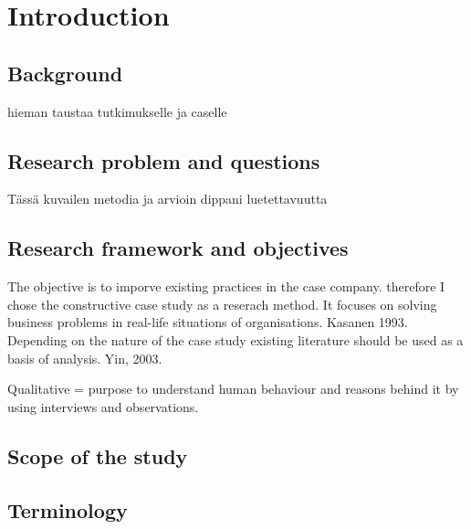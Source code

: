 \documentclass[12pt,a4paper,oneside,pdftex]{report}
\begin{document}
\pagestyle{headings}


% 

\chapter{Introduction}
\label{chapter:intro}






\section{Background}

hieman taustaa tutkimukselle ja caselle

\section{Research problem and questions}
\label{section:constructive}

Tässä kuvailen metodia ja arvioin dippani luetettavuutta

\section{Research framework and objectives}
\label{section:structure}

The objective is to imporve existing practices in the case company. therefore I chose the constructive case study as a reserach method. It focuses on solving business problems in real-life situations of organisations. Kasanen 1993. Depending on the nature of the case study existing literature should be used as a basis of analysis. Yin, 2003. 

Qualitative = purpose to understand human behaviour and reasons behind it by using interviews and observations. 

\section{Scope of the study}
\label{section:structure}

\section{Terminology}
\label{section:Terminology}
\end{document}
